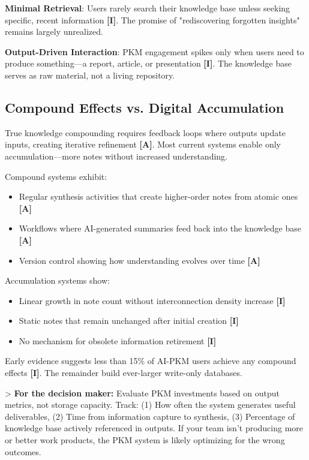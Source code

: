\documentclass[a4paper,11pt]{article}
\newcommand{\ilabel}{\textbf{\textcolor{icolor}{[I]}}}
\newcommand{\alabel}{\textbf{\textcolor{acolor}{[A]}}}
\begin{document}
\textbf{Minimal Retrieval}: Users rarely search their knowledge base unless seeking specific, recent information \ilabel{}. The promise of "rediscovering forgotten insights" remains largely unrealized.


\textbf{Output-Driven Interaction}: PKM engagement spikes only when users need to produce something—a report, article, or presentation \ilabel{}. The knowledge base serves as raw material, not a living repository.


\subsection{Compound Effects vs. Digital Accumulation}

True knowledge compounding requires feedback loops where outputs update inputs, creating iterative refinement \alabel{}. Most current systems enable only accumulation—more notes without increased understanding.


Compound systems exhibit:

\begin{itemize}
  \item Regular synthesis activities that create higher-order notes from atomic ones \alabel{}
  \item Workflows where AI-generated summaries feed back into the knowledge base \alabel{}
  \item Version control showing how understanding evolves over time \alabel{}
\end{itemize}

Accumulation systems show:

\begin{itemize}
  \item Linear growth in note count without interconnection density increase \ilabel{}
  \item Static notes that remain unchanged after initial creation \ilabel{}
  \item No mechanism for obsolete information retirement \ilabel{}
\end{itemize}

Early evidence suggests less than 15\% of AI-PKM users achieve any compound effects \ilabel{}. The remainder build ever-larger write-only databases.


> \textbf{For the decision maker:} Evaluate PKM investments based on output metrics, not storage capacity. Track: (1) How often the system generates useful deliverables, (2) Time from information capture to synthesis, (3) Percentage of knowledge base actively referenced in outputs. If your team isn't producing more or better work products, the PKM system is likely optimizing for the wrong outcomes.
\end{document}
